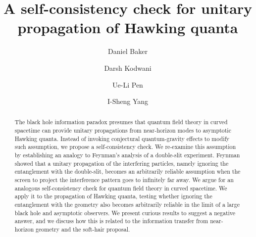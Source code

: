 \documentclass[aps,showpacs,onecolumn,floats,prd,superscriptaddress,nofootinbib]{revtex4-1}
\begin{document}
\title{A self-consistency check for unitary propagation of Hawking quanta}

\author{Daniel Baker}

\author{Darsh Kodwani}

\author{Ue-Li Pen}

\author{I-Sheng Yang}


\begin{abstract}
The black hole information paradox presumes that quantum field theory in curved spacetime can provide unitary propagations from near-horizon modes to asymptotic Hawking quanta. 
Instead of invoking conjectural quantum-gravity effects to modify such assumption, we propose a self-consistency check.
We re-examine this assumption by establishing an analogy to Feynman's analysis of a double-slit experiment. 
Feynman showed that a unitary propagation of the interfering particles, namely ignoring the entanglement with the double-slit, becomes an arbitrarily reliable assumption when the screen to project the interference pattern goes to infinitely far away.
We argue for an analogous self-consistency check for quantum field theory in curved spacetime.
We apply it to the propagation of Hawking quanta, testing whether ignoring the entanglement with the geometry also becomes arbitrarily reliable in the limit of a large black hole and asymptotic observers. 
We present curious results to suggest a negative answer, and we discuss how this is related to the information transfer from near-horizon geometry and the soft-hair proposal.
\end{abstract}
\end{document}
